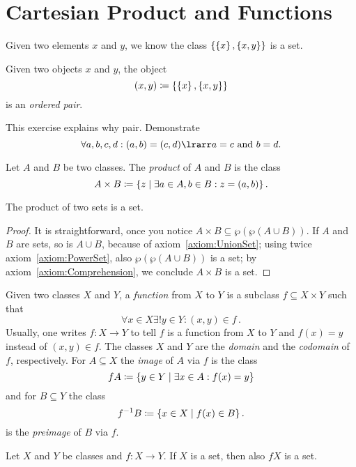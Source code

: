 
\section{Cartesian Product and Functions}

Given two elements \(x\) and \(y\), we know the class \(\left\{\left\{x\right\}, \left\{x, y\right\}\right\}\) is a set.

\begin{definition}
Given two objects \(x\) and \(y\), the object 
\[(x, y) \coloneq \left\{\left\{x\right\}, \left\{x, y\right\}\right\}\]
is an {\em ordered pair}. 
\end{definition}

\begin{exercise}
This exercise explains why  pair. Demonstrate
\[\forall a, b, c, d : (a, b) = (c, d) \lrarr a = c \text{ and } b = d .\]
\end{exercise}

\begin{definition}
Let \(A\) and \(B\) be two classes. The {\em product} of \(A\) and \(B\) is the class
\[A \times B \coloneq \left\{z \mid \exists a \in A, b \in B : z = (a, b)\right\}.\]
\end{definition}

\begin{theorem}
The product of two sets is a set.
\end{theorem}

\begin{proof}
It is straightforward, once you notice \(A \times B \subseteq \wp(\wp (A \cup B))\). If \(A\) and \(B\) are sets, so is \(A \cup B\), because of axiom~\ref{axiom:UnionSet}; using twice axiom~\ref{axiom:PowerSet}, also \(\wp(\wp (A \cup B))\) is a set; by axiom~\ref{axiom:Comprehension}, we conclude \(A \times B\) is a set.
\end{proof}


\begin{definition}[Functions]
Given two classes \(X\) and \(Y\), a {\em function} from \(X\) to \(Y\) is a subclass \(f \subseteq X \times Y\) such that%
\[\forall x \in X \exists! y \in Y : (x, y) \in f\,.\]
Usually, one writes \(f : X \to Y\) to tell \(f\) is a function from \(X\) to \(Y\) and \(f(x) = y\) instead of \((x, y) \in f\). The classes \(X\) and \(Y\) are the {\em domain} and the {\em codomain} of \(f\), respectively. For \(A \subseteq X\) the {\em image} of \(A\) via \(f\) is the class
\[fA \coloneq \left\{y \in Y \mid \exists x \in A : f(x) = y\right\}\]
and for \(B \subseteq Y\) the class
\[f^{-1}B \coloneq \left\{x \in X \mid f(x) \in B\right\}.\]
is the {\em preimage} of \(B\) via \(f\).
\end{definition}

\begin{axiom}\label{axiom:Replacement}
Let \(X\) and \(Y\) be classes and \(f : X \to Y\). If \(X\) is a set, then also \(fX\) is a set.
\end{axiom}
